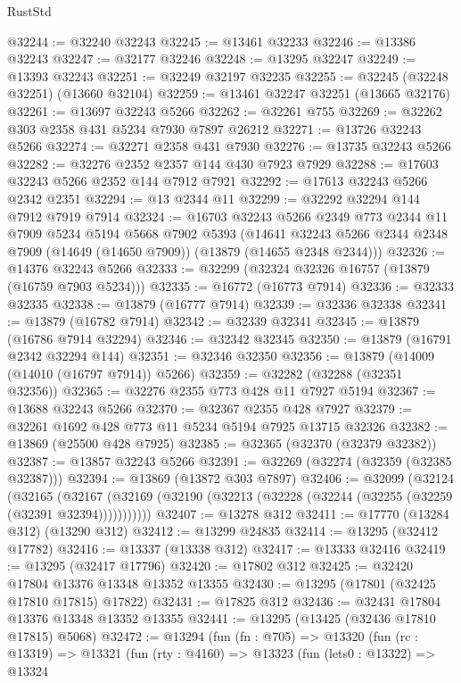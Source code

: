 \begin{lexlean}{RustStd}
\begin{coremodule}
@32244 := @32240 @32243
@32245 := @13461 @32233
@32246 := @13386 @32243
@32247 := @32177 @32246
@32248 := @13295 @32247
@32249 := @13393 @32243
@32251 := @32249 @32197 @32235
@32255 := @32245 (@32248 @32251) (@13660 @32104)
@32259 := @13461 @32247 @32251 (@13665 @32176)
@32261 := @13697 @32243 @5266
@32262 := @32261 @755
@32269 := @32262 @303 @2358 @431 @5234 @7930 @7897 @26212
@32271 := @13726 @32243 @5266
@32274 := @32271 @2358 @431 @7930
@32276 := @13735 @32243 @5266
@32282 := @32276 @2352 @2357 @144 @430 @7923 @7929
@32288 := @17603 @32243 @5266 @2352 @144 @7912 @7921
@32292 := @17613 @32243 @5266 @2342 @2351
@32294 := @13 @2344 @11
@32299 := @32292 @32294 @144 @7912 @7919 @7914
@32324 := @16703
    @32243
    @5266
    @2349
    @773
    @2344
    @11
    @7909
    @5234
    @5194
    @5668
    @7902
    @5393
    (@14641 @32243 @5266 @2344 @2348 @7909 (@14649 (@14650 @7909)) (@13879 (@14655 @2348 @2344)))
@32326 := @14376 @32243 @5266
@32333 := @32299 (@32324 @32326 @16757 (@13879 (@16759 @7903 @5234)))
@32335 := @16772 (@16773 @7914)
@32336 := @32333 @32335
@32338 := @13879 (@16777 @7914)
@32339 := @32336 @32338
@32341 := @13879 (@16782 @7914)
@32342 := @32339 @32341
@32345 := @13879 (@16786 @7914 @32294)
@32346 := @32342 @32345
@32350 := @13879 (@16791 @2342 @32294 @144)
@32351 := @32346 @32350
@32356 := @13879 (@14009 (@14010 (@16797 @7914)) @5266)
@32359 := @32282 (@32288 (@32351 @32356))
@32365 := @32276 @2355 @773 @428 @11 @7927 @5194
@32367 := @13688 @32243 @5266
@32370 := @32367 @2355 @428 @7927
@32379 := @32261 @1692 @428 @773 @11 @5234 @5194 @7925 @13715 @32326
@32382 := @13869 (@25500 @428 @7925)
@32385 := @32365 (@32370 (@32379 @32382))
@32387 := @13857 @32243 @5266
@32391 := @32269 (@32274 (@32359 (@32385 @32387)))
@32394 := @13869 (@13872 @303 @7897)
@32406 := @32099
    (@32124
      (@32165
        (@32167 (@32169 (@32190 (@32213 (@32228 (@32244 (@32255 (@32259 (@32391 @32394)))))))))))
@32407 := @13278 @312
@32411 := @17770 (@13284 @312) (@13290 @312)
@32412 := @13299 @24835
@32414 := @13295 (@32412 @17782)
@32416 := @13337 (@13338 @312)
@32417 := @13333 @32416
@32419 := @13295 (@32417 @17796)
@32420 := @17802 @312
@32425 := @32420 @17804 @13376 @13348 @13352 @13355
@32430 := @13295 (@17801 (@32425 @17810 @17815) @17822)
@32431 := @17825 @312
@32436 := @32431 @17804 @13376 @13348 @13352 @13355
@32441 := @13295 (@13425 (@32436 @17810 @17815) @5068)
@32472 := @13294
    (fun (fn : @705) =>
    @13320
      (fun (rc : @13319) =>
      @13321
        (fun (rty : @4160) =>
        @13323
          (fun (lets0 : @13322) =>
          @13324

\end{coremodule}
\end{lexlean}
